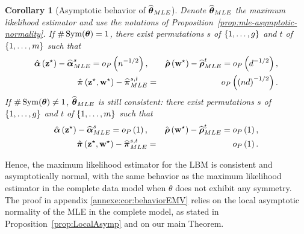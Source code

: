 \documentclass[]{imsart}
\newcommand{\1}{\mathds{1}}
\numberwithin{equation}{section}
\theoremstyle{plain}
\newtheorem{corollaire}[thm]{Corollary}
\theoremstyle{remark}
\begin{document}
\begin{corollaire}[Asymptotic behavior of $\widehat{\boldsymbol{\theta}}_{MLE}$]\label{cor:behaviorEMV} Denote $\widehat{\boldsymbol{\theta}}_{MLE}$ the maximum likelihood estimator and use the notations of Proposition~\ref{prop:mle-asymptotic-normality}. If $\# \operatorname{Sym}(\boldsymbol{\theta})=1$, there exist permutations $s$ of $\{1, \dots, g\}$ and $t$ of $\{1, \dots, m\}$ such that
\begin{eqnarray*}
\hat{\bpi}\left(\bzs\right)-\bpiEMV^{s}=o_{P}\left(\n^{-1/2}\right),&&\hat{\brho}\left(\bws\right)-\brhoEMV^{t}=o_{P}\left(\dd^{-1/2}\right),\\
\hat{\bal}\left(\bzs,\bws\right)-\balEMV^{s,t}&=&o_{P}\left(\left(\n\dd\right)^{-1/2}\right).\\
\end{eqnarray*}
If $\# \operatorname{Sym}(\boldsymbol{\theta})\neq1$,  $\widehat{\boldsymbol{\theta}}_{MLE}$ is still consistent:  there exist permutations $s$ of $\{1, \dots, g\}$ and $t$ of $\{1, \dots, m\}$ such that
\begin{eqnarray*}
\hat{\bpi}\left(\bzs\right)-\bpiEMV^{s}=o_{P}\left(1\right),&&\hat{\brho}\left(\bws\right)-\brhoEMV^{t}=o_{P}\left(1\right),\\
\hat{\bal}\left(\bzs,\bws\right)-\balEMV^{s,t}&=&o_{P}\left(1\right). \\
\end{eqnarray*}
\end{corollaire}
Hence, the maximum likelihood estimator for the LBM is consistent and asymptotically normal, with the same behavior as the maximum likelihood estimator in the complete data model when $\theta$ does not exhibit any symmetry.
The proof in appendix \ref{annexe:cor:behaviorEMV} relies on the local asymptotic normality of the MLE in the complete model, as stated in Proposition~\ref{prop:LocalAsymp} and on our main Theorem.
\end{document}
